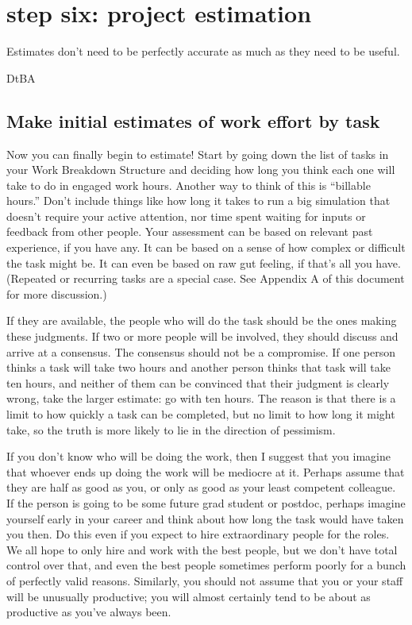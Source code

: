 \documentclass[12pt,oneside]{book}
\begin{document}
\newpage
{}
\section*{step six: project estimation}

\epigraph{Estimates don't need to be perfectly accurate as much as they need to be useful.}{DtBA}

\subsection*{Make initial estimates of work effort by task}

Now you can finally begin to estimate! Start by going down the list of tasks in your Work Breakdown Structure and deciding how long you think each one will take to do in engaged work hours. Another way to think of this is ``billable hours.'' Don't include things like how long it takes to run a big simulation that doesn't require your active attention, nor time spent waiting for inputs or feedback from other people. Your assessment can be based on relevant past experience, if you have any. It can be based on a sense of how complex or difficult the task might be. It can even be based on raw gut feeling, if that's all you have. (Repeated or recurring tasks are a special case. See Appendix A of this document for more discussion.)

If they are available, the people who will do the task should be the ones making these judgments. If two or more people will be involved, they should discuss and arrive at a consensus. The consensus should not be a compromise. If one person thinks a task will take two hours and another person thinks that task will take ten hours, and neither of them can be convinced that their judgment is clearly wrong, take the larger estimate: go with ten hours. The reason is that there is a limit to how quickly a task can be completed, but no limit to how long it might take, so the truth is more likely to lie in the direction of pessimism.

If you don't know who will be doing the work, then I suggest that you imagine that whoever ends up doing the work will be mediocre at it. Perhaps assume that they are half as good as you, or only as good as your least competent colleague. If the person is going to be some future grad student or postdoc, perhaps imagine yourself early in your career and think about how long the task would have taken you then. Do this even if you expect to hire extraordinary people for the roles. We all hope to only hire and work with the best people, but we don't have total control over that, and even the best people sometimes perform poorly for a bunch of perfectly valid reasons. Similarly, you should not assume that you or your staff will be unusually productive; you will almost certainly tend to be about as productive as you've always been.
\end{document}
